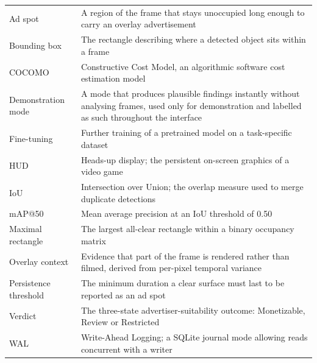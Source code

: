 \documentclass[
12pt,
a4paper,
oneside
]{report}
\begin{document}
\begin{longtable}{p{4cm}p{9cm}}
Ad spot &
A region of the frame that stays unoccupied long enough to carry an overlay
advertisement \\

Bounding box &
The rectangle describing where a detected object sits within a frame \\

COCOMO &
Constructive Cost Model, an algorithmic software cost estimation model \\

Demonstration mode &
A mode that produces plausible findings instantly without analysing frames,
used only for demonstration and labelled as such throughout the interface \\

Fine-tuning &
Further training of a pretrained model on a task-specific dataset \\

HUD &
Heads-up display; the persistent on-screen graphics of a video game \\

IoU &
Intersection over Union; the overlap measure used to merge duplicate detections
\\

mAP@50 &
Mean average precision at an IoU threshold of 0.50 \\

Maximal rectangle &
The largest all-clear rectangle within a binary occupancy matrix \\

Overlay context &
Evidence that part of the frame is rendered rather than filmed, derived from
per-pixel temporal variance \\

Persistence threshold &
The minimum duration a clear surface must last to be reported as an ad spot \\

Verdict &
The three-state advertiser-suitability outcome: Monetizable, Review or
Restricted \\

WAL &
Write-Ahead Logging; a SQLite journal mode allowing reads concurrent with a
writer \\
\end{longtable}

\end{document}
